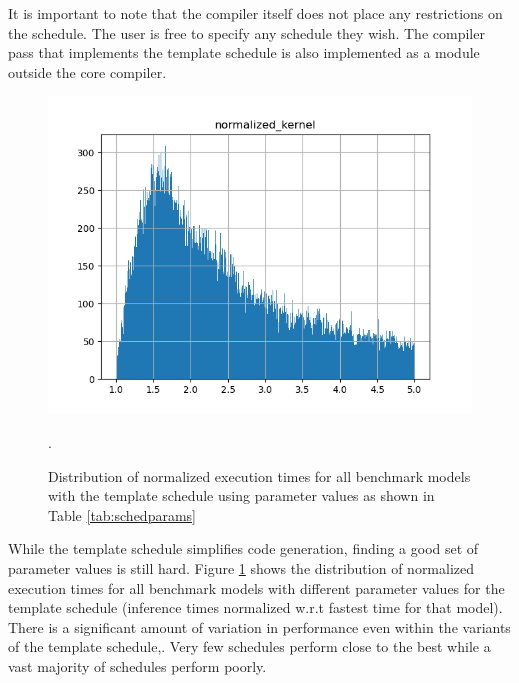 It is important to note that the \Treebeard{} compiler itself does not place any 
restrictions on the schedule. The user is free to specify any schedule they wish.
The compiler pass that implements the template schedule is also implemented as a 
module outside the core \Treebeard{} compiler. 

\begin{figure}[htb]
  \centering
  \includegraphics[width=\linewidth]{figures/normalized_kernel_histogram_lt5.png}
  \caption{Distribution of normalized execution times for all benchmark models
  with the template schedule using parameter values as shown in Table \ref{tab:schedparams}}. 
  \label{Fig:ExecTimeDistribution}
\end{figure}

While the template schedule simplifies code generation, finding a good set of 
parameter values is still hard.
Figure \ref{Fig:ExecTimeDistribution} shows the distribution of normalized execution times
for all benchmark models with different parameter values for the template schedule (inference
times normalized w.r.t fastest time for that model).
There is a significant amount of variation in performance even within the variants of the
template schedule,. Very few schedules perform close to the best while a vast majority of
schedules perform poorly.

